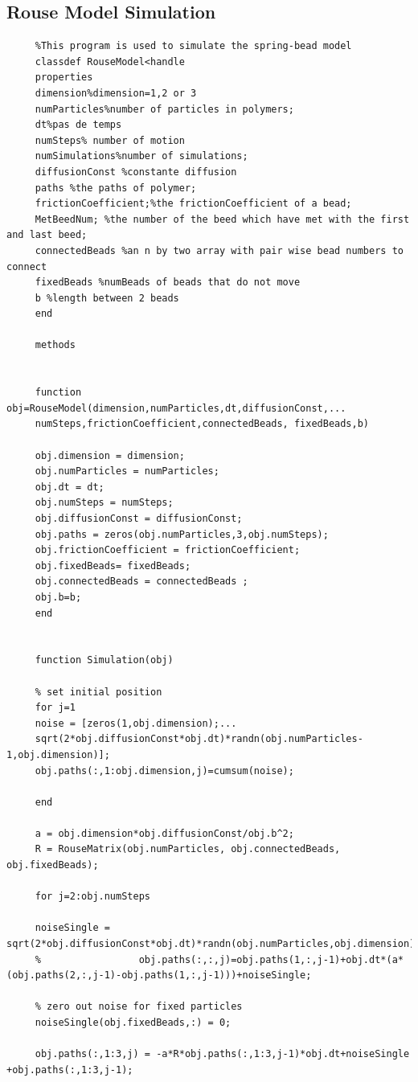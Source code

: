 \documentclass{article}
\begin{document}
	 \subsection{Rouse Model Simulation}
	 \begin{lstlisting}
	 %This program is used to simulate the spring-bead model
	 classdef RouseModel<handle
	 properties
	 dimension%dimension=1,2 or 3
	 numParticles%number of particles in polymers;
	 dt%pas de temps
	 numSteps% number of motion
	 numSimulations%number of simulations;
	 diffusionConst %constante diffusion
	 paths %the paths of polymer;
	 frictionCoefficient;%the frictionCoefficient of a bead;
	 MetBeedNum; %the number of the beed which have met with the first and last beed;
	 connectedBeads %an n by two array with pair wise bead numbers to connect
	 fixedBeads %numBeads of beads that do not move
	 b %length between 2 beads 
	 end
	 
	 methods
	 
	 
	 function obj=RouseModel(dimension,numParticles,dt,diffusionConst,...
	 numSteps,frictionCoefficient,connectedBeads, fixedBeads,b)
	 
	 obj.dimension = dimension;
	 obj.numParticles = numParticles;
	 obj.dt = dt;
	 obj.numSteps = numSteps;
	 obj.diffusionConst = diffusionConst;
	 obj.paths = zeros(obj.numParticles,3,obj.numSteps);
	 obj.frictionCoefficient = frictionCoefficient;
	 obj.fixedBeads= fixedBeads;
	 obj.connectedBeads = connectedBeads ;
	 obj.b=b;
	 end
	 
	 
	 function Simulation(obj)
	 
	 % set initial position
	 for j=1
	 noise = [zeros(1,obj.dimension);...
	 sqrt(2*obj.diffusionConst*obj.dt)*randn(obj.numParticles-1,obj.dimension)];
	 obj.paths(:,1:obj.dimension,j)=cumsum(noise);
	 
	 end
	 
	 a = obj.dimension*obj.diffusionConst/obj.b^2;
	 R = RouseMatrix(obj.numParticles, obj.connectedBeads, obj.fixedBeads);
	 
	 for j=2:obj.numSteps
	 
	 noiseSingle = sqrt(2*obj.diffusionConst*obj.dt)*randn(obj.numParticles,obj.dimension);
	 %                 obj.paths(:,:,j)=obj.paths(1,:,j-1)+obj.dt*(a*(obj.paths(2,:,j-1)-obj.paths(1,:,j-1)))+noiseSingle;
	 
	 % zero out noise for fixed particles
	 noiseSingle(obj.fixedBeads,:) = 0;
	 
	 obj.paths(:,1:3,j) = -a*R*obj.paths(:,1:3,j-1)*obj.dt+noiseSingle +obj.paths(:,1:3,j-1);
	 

\end{lstlisting}
\end{document}
